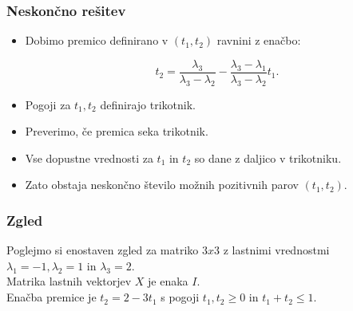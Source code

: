 \documentclass{beamer}
\begin{document}
\begin{frame}
\frametitle{Neskončno rešitev}
\begin{itemize}
\item Dobimo premico definirano v $(t_1,t_2)$ ravnini z enačbo:
\begin{block}{}
$$t_2=\frac{\lambda_3}{\lambda_3 - \lambda_2} -\frac{\lambda_3 -\lambda_1}{\lambda_3 -\lambda_2}t_1.$$
\end{block}\pause
\item Pogoji za $t_1,t_2$ definirajo trikotnik.
\item Preverimo, če premica seka trikotnik.
\item Vse dopustne vrednosti za $t_1$ in $t_2$ so dane z daljico v trikotniku. 
\item Zato obstaja neskončno število možnih pozitivnih parov $(t_1,t_2)$.
\end{itemize}
\end{frame}
\begin{frame}
\frametitle{Zgled}
Poglejmo si enostaven zgled za matriko $3x3$ z lastnimi \medskip vrednostmi $\lambda_1=-1, \lambda_2=1$ in $\lambda_3=2$.\medskip \\ Matrika lastnih vektorjev $X$ je enaka $I$.\medskip \\
Enačba premice je $t_2=2-3t_1$ s pogoji $t_1, t_2 \ge 0$ in $t_1+t_2\le 1$.
\end{frame}
\end{document}
